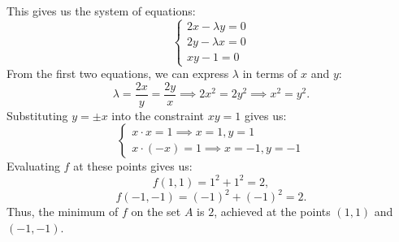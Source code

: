 \documentclass[11pt]{article}
\begin{document}
This gives us the system of equations:
\[\begin{cases}
2x - \lambda y = 0 \\
2y - \lambda x = 0 \\
xy - 1 = 0
\end{cases}\]
From the first two equations, we can express \(\lambda\) in terms of \(x\) and \(y\):
\[\lambda = \frac{2x}{y} = \frac{2y}{x} \implies 2x^2 = 2y^2 \implies x^2 = y^2.\]
Substituting \(y = \pm x\) into the constraint \(xy = 1\) gives us:
\[\begin{cases}
x \cdot x = 1 \implies x = 1, y = 1 \\
x \cdot (-x) = 1 \implies x = -1, y = -1
\end{cases}\]
Evaluating \(f\) at these points gives us:
\[f(1, 1) = 1^2 + 1^2 = 2,\]
\[f(-1, -1) = (-1)^2 + (-1)^2 = 2.\]
Thus, the minimum of \(f\) on the set \(A\) is \(2\), achieved at the points \((1, 1)\) and \((-1, -1)\).
\end{document}
